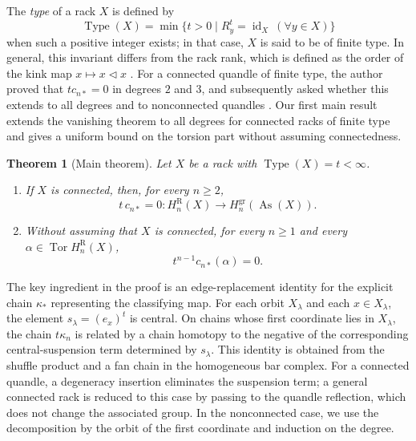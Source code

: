 \documentclass[10pt,a4paper]{amsart}
\newtheorem{theorem}{Theorem}[section]
\DeclareMathOperator{\As}{As}
\DeclareMathOperator{\Tor}{Tor}
\DeclareMathOperator{\Type}{Type}
\newcommand{\gr}{\mathrm{gr}}
\newcommand{\R}{\mathrm R}
\begin{document}
The \emph{type} of a rack $X$ is defined by
\[
 \Type(X)=\min\{t>0\mid R_y^t=\operatorname{id}_X\ (\forall y\in X)\}
\]
when such a positive integer exists; in that case, $X$ is said to be of finite type. In general, this invariant differs from the rack rank, which is defined as the order of the kink map $x\mapsto x\lhd x$ \cite{ElhamdadiNelsonRank}. For a connected quandle of finite type, the author proved that $t c_{n*}=0$ in degrees $2$ and $3$, and subsequently asked whether this extends to all degrees and to nonconnected quandles \cite[Theorem~6.1 and the problem immediately following it]{NosakaAdjoint}. Our first main result extends the vanishing theorem to all degrees for connected racks of finite type and gives a uniform bound on the torsion part without assuming connectedness.

\begin{theorem}[Main theorem]
\label{thm:main}
Let $X$ be a rack with $\Type(X)=t<\infty$.
\begin{enumerate}[label=(\arabic*)]
\item If $X$ is connected, then, for every $n\ge2$,
\[
        t\,c_{n*}=0
        \colon H_n^\R(X)\longrightarrow H_n^{\gr}(\As(X)).
\]
\item Without assuming that $X$ is connected, for every $n\ge1$ and every
$\alpha\in\Tor H_n^\R(X)$,
\[
        t^{n-1}c_{n*}(\alpha)=0.
\]
\end{enumerate}
\end{theorem}

The key ingredient in the proof is an edge-replacement identity for the explicit chain $\kappa_*$ representing the classifying map. For each orbit $X_\lambda$ and each $x\in X_\lambda$, the element $s_\lambda=(e_x)^t$ is central. On chains whose first coordinate lies in $X_\lambda$, the chain $t\kappa_n$ is related by a chain homotopy to the negative of the corresponding central-suspension term determined by $s_\lambda$. This identity is obtained from the shuffle product and a fan chain in the homogeneous bar complex. For a connected quandle, a degeneracy insertion eliminates the suspension term; a general connected rack is reduced to this case by passing to the quandle reflection, which does not change the associated group. In the nonconnected case, we use the decomposition by the orbit of the first coordinate and induction on the degree.
\end{document}
